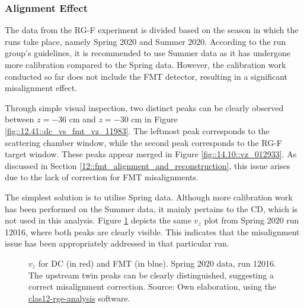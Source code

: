 \subsubsection{Alignment Effect}
\label{14.11::alignment_effect}
    The data from the RG-F experiment is divided based on the season in which the runs take place, namely Spring 2020 and Summer 2020.
    According to the run group's guidelines, it is recommended to use Summer data as it has undergone more calibration compared to the Spring data.
    However, the calibration work conducted so far does not include the FMT detector, resulting in a significant misalignment effect.

    Through simple visual inspection, two distinct peaks can be clearly observed between $z = -36$ cm and $z = -30$ cm in Figure \ref{fig::12.41::dc_vs_fmt_vz_11983}.
    The leftmost peak corresponds to the scattering chamber window, while the second peak corresponds to the RG-F target window.
    These peaks appear merged in Figure \ref{fig::14.10::vz_012933}.
    As discussed in Section \ref{12::fmt_alignment_and_reconstruction}, this issue arises due to the lack of correction for FMT misalignments.

    The simplest solution is to utilise Spring data.
    Although more calibration work has been performed on the Summer data, it mainly pertains to the CD, which is not used in this analysis.
    Figure \ref{fig::14.11::vz_012016} depicts the same $v_z$ plot from Spring 2020 run 12016, where both peaks are clearly visible.
    This indicates that the misalignment issue has been appropriately addressed in that particular run.

    \begin{figure}[t!]
        \centering{}
        \caption[$v_z$ for DC and FMT, run 12016]{$v_z$ for DC (in red) and FMT (in blue).
        Spring 2020 data, run 12016. The upstream twin peaks can be clearly distinguished, suggesting a correct misalignment correction.
        Source: Own elaboration, using the \href{https://github.com/bleaktwig/clas12-rge-analysis}{clas12-rge-analysis} software.}
        \label{fig::14.11::vz_012016}
    \end{figure}
